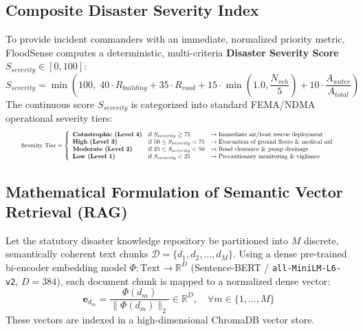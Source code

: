 \subsection{Composite Disaster Severity Index}
To provide incident commanders with an immediate, normalized priority metric, FloodSense computes a deterministic, multi-criteria \textbf{Disaster Severity Score} $S_{severity} \in [0, 100]$:
\begin{equation}
    S_{severity} = \min\left(100, \; 40 \cdot R_{building} + 35 \cdot R_{road} + 15 \cdot \min(1.0, \frac{N_{veh}}{5}) + 10 \cdot \frac{A_{water}}{A_{total}}\right)
\end{equation}
The continuous score $S_{severity}$ is categorized into standard FEMA/NDMA operational severity tiers:
\begin{equation}
\label{eq:severity_tier}
\resizebox{0.95\textwidth}{!}{$
\displaystyle
\text{Severity Tier} = \left\{
\begin{array}{lll}
    \textbf{Catastrophic (Level 4)} & \text{if } S_{severity} \ge 75 & \rightarrow \text{Immediate air/boat rescue deployment} \\
    \textbf{High (Level 3)} & \text{if } 50 \le S_{severity} < 75 & \rightarrow \text{Evacuation of ground floors \& medical aid} \\
    \textbf{Moderate (Level 2)} & \text{if } 25 \le S_{severity} < 50 & \rightarrow \text{Road clearance \& pump drainage} \\
    \textbf{Low (Level 1)} & \text{if } S_{severity} < 25 & \rightarrow \text{Precautionary monitoring \& vigilance}
\end{array}
\right.
$}
\end{equation}

\subsection{Mathematical Formulation of Semantic Vector Retrieval (RAG)}
Let the statutory disaster knowledge repository be partitioned into $M$ discrete, semantically coherent text chunks $\mathcal{D} = \{d_1, d_2, \dots, d_M\}$. Using a dense pre-trained bi-encoder embedding model $\Phi: \text{Text} \rightarrow \mathbb{R}^D$ (Sentence-BERT / \texttt{all-MiniLM-L6-v2}, $D = 384$), each document chunk is mapped to a normalized dense vector:
\begin{equation}
    \mathbf{e}_{d_m} = \frac{\Phi(d_m)}{\|\Phi(d_m)\|_2} \in \mathbb{R}^D, \quad \forall m \in \{1, \dots, M\}
\end{equation}
These vectors are indexed in a high-dimensional ChromaDB vector store.

